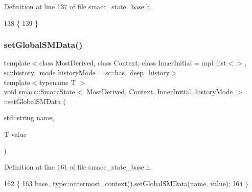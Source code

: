 Definition at line 137 of file smacc\+\_\+state\+\_\+base.\+h.


\begin{DoxyCode}
138   \{
139   \}
\end{DoxyCode}
\mbox{\label{classsmacc_1_1SmaccState_a98f2673b257479e0a3615d5d8279a591}} 
\subsubsection{\texorpdfstring{set\+Global\+S\+M\+Data()}{setGlobalSMData()}}
{\footnotesize\ttfamily template$<$class Most\+Derived, class Context, class Inner\+Initial = mpl\+::list$<$$>$, sc\+::history\+\_\+mode history\+Mode = sc\+::has\+\_\+deep\+\_\+history$>$ \\
template$<$typename T $>$ \\
void \hyperlink{classsmacc_1_1SmaccState}{smacc\+::\+Smacc\+State}$<$ Most\+Derived, Context, Inner\+Initial, history\+Mode $>$\+::set\+Global\+S\+M\+Data (\begin{DoxyParamCaption}\item[{std\+::string}]{name,  }\item[{T}]{value }\end{DoxyParamCaption})\hspace{0.3cm}{\ttfamily [inline]}}



Definition at line 161 of file smacc\+\_\+state\+\_\+base.\+h.


\begin{DoxyCode}
162   \{
163     base\_type::outermost\_context().setGlobalSMData(name, value);
164   \}
\end{DoxyCode}
\mbox{\label{classsmacc_1_1SmaccState_a1dccb401e1a99031863a21a590d953e6}} 
